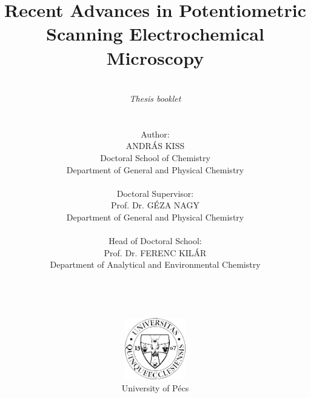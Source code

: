 \pagestyle{empty}

\title{\textbf{Recent Advances in Potentiometric Scanning Electrochemical Microscopy}}

\author{\\ \emph{Thesis booklet} \\ \\ \\ Author: \\ ANDRÁS KISS \\ Doctoral School of Chemistry \\ Department of General and Physical Chemistry \\ \\ Doctoral Supervisor: \\ Prof. Dr. GÉZA NAGY
\\ Department of General and Physical Chemistry \\
\\ Head of Doctoral School: \\
Prof. Dr. FERENC KILÁR\\
Department of Analytical and Environmental Chemistry \\
\\ \\ \\ \\
\includegraphics[width=0.2\textwidth]{img/pte_logo.eps} \\
University of Pécs}
\maketitle

\thispagestyle{empty}
\large
\setcounter{tocdepth}{4}
\thispagestyle{empty}
\thispagestyle{empty}
